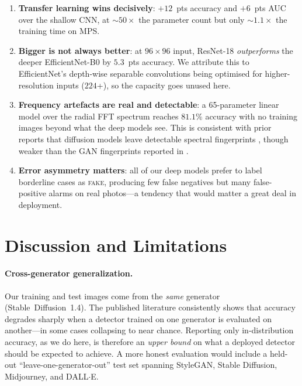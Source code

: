 \documentclass{article}
\begin{document}
\begin{enumerate}\itemsep0.15em
  \item \textbf{Transfer learning wins decisively}: $+12$~pts accuracy
        and $+6$~pts AUC over the shallow CNN, at $\sim\!50\times$ the
        parameter count but only $\sim\!1.1\times$ the training
        time on MPS.
  \item \textbf{Bigger is not always better}: at $96\times96$ input,
        \mbox{ResNet-18} \emph{outperforms} the deeper
        \mbox{EfficientNet-B0} by $5.3$~pts accuracy. We attribute
        this to EfficientNet's depth-wise separable convolutions
        being optimised for higher-resolution inputs ($224$+), so the
        capacity goes unused here.
  \item \textbf{Frequency artefacts are real and detectable}: a 65-parameter
        linear model over the radial FFT spectrum reaches $81.1\%$
        accuracy with no training images beyond what the deep models
        see. This is consistent with prior reports that diffusion
        models leave detectable spectral fingerprints
        \citep{corvi2023detection}, though weaker than the GAN
        fingerprints reported in \citet{frank2020leveraging}.
  \item \textbf{Error asymmetry matters}: all of our deep models
        prefer to label borderline cases as \textsc{fake}, producing
        few false negatives but many false-positive alarms on real
        photos---a tendency that would matter a great deal in
        deployment.
\end{enumerate}

\section{Discussion and Limitations}
\label{sec:discussion}

\paragraph{Cross-generator generalization.}
Our training and test images come from the \emph{same} generator
(Stable~Diffusion~1.4). The published literature
\citep{ojha2023towards,corvi2023detection} consistently shows that
accuracy degrades sharply when a detector trained on one generator is
evaluated on another---in some cases collapsing to near
chance. Reporting only in-distribution accuracy, as we do here, is
therefore an \emph{upper bound} on what a deployed detector should be
expected to achieve. A more honest evaluation would include a held-out
``leave-one-generator-out'' test set spanning StyleGAN, Stable
Diffusion, Midjourney, and DALL$\cdot$E.
\end{document}
